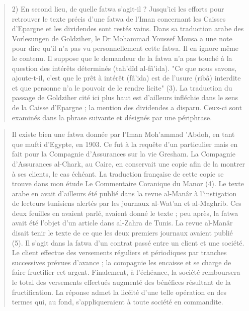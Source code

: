 \begin{quote}
    2) En second lieu, de quelle fatwa s'agit-il ? Jusqu'ici les efforts pour
retrouver le texte précis d'une fatwa de l'Iman concernant les Caisses d'Epargne et
les dividendes sont restés vains. Dans sa traduction arabe des Vorlesungen de
Goldziher, le Dr Mohammad Youssef Mousa a une note pour dire qu'il n'a pas vu
personnellement cette fatwa. Il en ignore même le contenu. Il suppose que le
demandeur de la fatwa n'a pas touché à la question des intérêts déterminés
(tah'dîd al-fâ'ida). "Ce que nous savons, ajoute-t-il, c'est que le prêt à intérêt
(fâ'ida) est de l'usure (ribâ) interdite et que personne n'a le pouvoir de le rendre
licite" (3). La traduction du passage de Goldziher cité ici plus haut est d'ailleurs
infléchie dans le sens de la Caisse d'Epargne ; la mention des dividendes a disparu.
Ceux-ci sont examinés dans la phrase suivante et désignés par une périphrase.
\end{quote}

\begin{quote}
    Il existe bien une fatwa donnée par l'Iman Moh'ammad 'Abdoh, en tant que
mufti d'Egypte, en 1903. Ce fut à la requête d'un particulier mais en fait pour la
Compagnie d'Assurances sur la vie Gresham. La Compagnie d'Assurances al-Chark,
au Caire, en conservait une copie afin de la montrer à ses clients, le cas échéant.
La traduction française de cette copie se trouve dans mon étude Le Commentaire
Coranique du Manor (4). Le texte arabe en avait d'ailleurs été publié dans la revue
al-Manâr à l'instigation de lecteurs tunisiens alertés par les journaux al-Wat'an et
al-Maghrib. Ces deux feuilles en avaient parlé, avaient donné le texte ; peu après,
la fatwa avait été l'objet d'un article dans al-Zahra de Tunis. La revue al-Manâr
disait tenir le texte de ce que les deux premiers journaux avaient publié (5).
Il s'agit dans la fatwa d'un contrat passé entre un client et une société. Le
client effectue des versements réguliers et périodiques par tranches successives
prévues d'avance ; la compagnie les encaisse et se charge de faire fructifier cet
argent. Finalement, à l'échéance, la société remboursera le total des versements
effectués augmenté des bénéfices résultant de la fructification. La réponse admet
la licéité d'une telle opération en des termes qui, au fond, s'appliqueraient à toute
société en commandite.
\end{quote}

